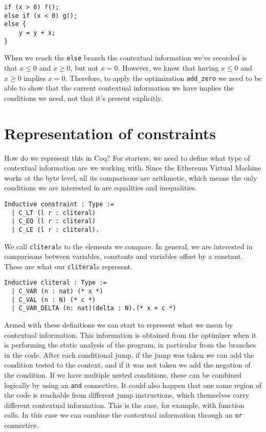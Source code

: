 \begin{verbatim}
if (x > 0) f();
else if (x < 0) g();
else {
    y = y + x;
}
\end{verbatim}

When we reach the \texttt{else} branch the contextual information we've recorded is that 
$x \le 0$ and $x \ge 0$, but not $x = 0$. However, we know that having $x \le 0$ and $x \ge 0$ implies 
$x = 0$. Therefore, to apply the optimization \texttt{add_zero} we need to be able to show 
that the current contextual information we have implies the conditions we need, not that it's present
explicitly.

\section{Representation of constraints}

How do we represent this in Coq? For starters, we need to define what type of contextual information
are we working with. Since the Ethereum Virtual Machine works at the byte level, all its comparisons
are arithmetic, which means the only conditions we are interested in are equalities and inequalities.

\begin{verbatim}
Inductive constraint : Type :=
  | C_LT (l r : cliteral)
  | C_EQ (l r : cliteral)
  | C_LE (l r : cliteral).
\end{verbatim}

We call \texttt{cliteral}s to the elements we compare. In general, we are interested in 
comparisons between variables, constants and variables offset by a constant. These are what our 
\texttt{cliteral}s represent.

\begin{verbatim}
Inductive cliteral : Type :=
  | C_VAR (n : nat) (* x *)
  | C_VAL (n : N) (* c *)
  | C_VAR_DELTA (n: nat)(delta : N).(* x + c *)
\end{verbatim}

Armed with these definitions we can start to represent what we mean by contextual information. This 
information is obtained from the optimizer when it is performing the static analysis of the program, 
in particular from the branches in the code. After each conditional jump, if the jump was taken we 
can add the condition tested to the context, and if it was not taken we add the negation of the 
condition. If we have multiple nested conditions, these can be combined logically by using an 
\texttt{and} connective. It could also happen that one same region of the code is reachable 
from different jump instructions, which themselves carry different contextual information. This is the 
case, for example, with function calls. In this case we can combine the contextual information through 
an \texttt{or} connective. 

